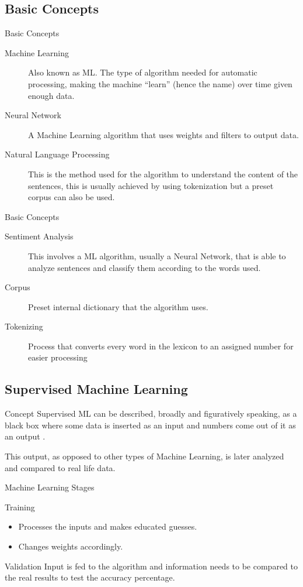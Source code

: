 \documentclass[11pt]{beamer}
\begin{document}
\subsection{Basic Concepts}
\begin{frame}{Basic Concepts}
	\begin{description}
	\item[Machine Learning]{Also known as ML. The type of algorithm needed for automatic processing, making the machine ``learn'' (hence the name) over time given enough data.}
	\item[Neural Network]{A Machine Learning algorithm that uses weights and filters to output data.}
	\item[Natural Language Processing]{This is the method used for the algorithm to understand the content of the sentences, this is usually achieved by using tokenization but a preset corpus can also be used.}	
	\end{description}
\end{frame}

\begin{frame}{Basic Concepts}
	\begin{description}
	\item[Sentiment Analysis]{This involves a ML algorithm, usually a Neural Network, that is able to analyze sentences and classify them according to the words used.}
	\item[Corpus]{Preset internal dictionary that the algorithm uses.}
	\item[Tokenizing]{Process that converts every word in the lexicon to an assigned number for easier 	processing}
	\end{description}
\end{frame}

\subsection{Supervised Machine Learning}
\begin{frame}{Concept}
Supervised ML can be described, broadly and figuratively speaking, as a black box where some data is inserted as an input and numbers come out of it as an output \citep{rf8}. 

This output, as opposed to other types of Machine Learning, is later analyzed and compared to real life data.
\end{frame}
\begin{frame}{Machine Learning Stages}
	\begin{block}{Training}
		\begin{itemize}
		 \item Processes the inputs and makes educated guesses.
		 \item Changes weights accordingly.
		\end{itemize}
	\end{block}
	\begin{block}{Validation}
	Input is fed to the algorithm and information needs to be compared to the real results to test the accuracy percentage.
	\end{block}
\end{frame}
\end{document}
